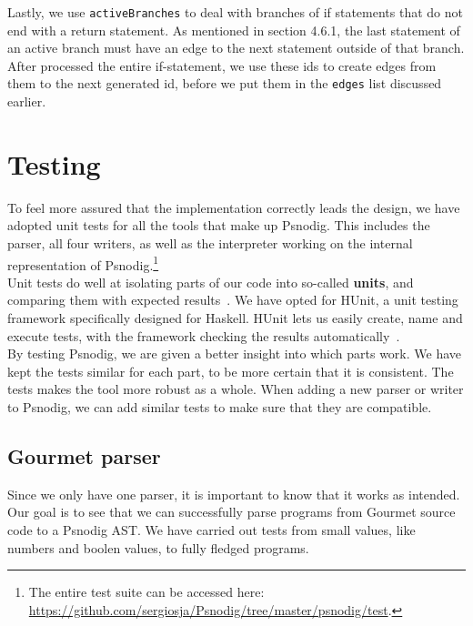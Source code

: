 Lastly, we use \texttt{activeBranches} to deal with branches of if statements that do not end with a return statement. As mentioned in section 4.6.1, the last statement of an active branch must have an edge to the next statement outside of that branch. After processed the entire if-statement, we use these ids to create edges from them to the next generated id, before we put them in the \texttt{edges} list discussed earlier. \\

\section{Testing}

To feel more assured that the implementation correctly leads the design, we have adopted unit tests for all the tools that make up Psnodig. This includes the parser, all four writers, as well as the interpreter working on the internal representation of Psnodig.\footnote{The entire test suite can be accessed here: \url{https://github.com/sergiosja/Psnodig/tree/master/psnodig/test}.} \\

Unit tests do well at isolating parts of our code into so-called \textbf{units}, and comparing them with expected results~\cite{whatIsUnitTesting}. We have opted for HUnit, a unit testing framework specifically designed for Haskell. HUnit lets us easily create, name and execute tests, with the framework checking the results automatically~\cite{hunit}. \\

By testing Psnodig, we are given a better insight into which parts work. We have kept the tests similar for each part, to be more certain that it is consistent. The tests makes the tool more robust as a whole. When adding a new parser or writer to Psnodig, we can add similar tests to make sure that they are compatible.

\subsection{Gourmet parser}

Since we only have one parser, it is important to know that it works as intended. Our goal is to see that we can successfully parse programs from Gourmet source code to a Psnodig AST. We have carried out tests from small values, like numbers and boolen values, to fully fledged programs. \\

